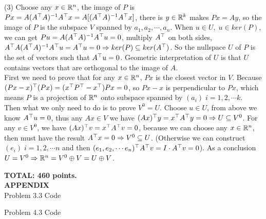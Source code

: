 \documentclass[12pt]{article}
\begin{document}
\medskip
(3) Choose any $x \in \mathbb{R}^n$, the image of $P$ is $Px = A(A^{\top}A)^{-1} A^{\top} x = A [(A^{\top}A)^{-1} A^{\top} x]$, there is $y \in \mathbb{R}^k$ makes $Px = Ay$, so the image of $P$ is the subspace $V$ spanned by $a_1, a_2, \cdots, a_n$.
When $u \in U ,\; u \in ker(P)$, we can get $Pu = A(A^{\top}A)^{-1} A^{\top} u = 0$, multiply $A^{\top}$ on both sides, $A^{\top} A (A^{\top}A)^{-1} A^{\top} u =  A^{\top} u = 0 \Rightarrow ker(P) \subseteq ker(A^{\top})$. So the nullspace $U$ of $P$ is the set of vectors such that $A^{\top} u = 0$. Geometric interpretation of $U$ is that $U$ contains vectors that are orthogonal to the image of $A$.\\
\medskip
First we need to prove that for any $x \in \mathbb{R}^n$, $Px$ is the closest vector in $V$. Because $(Px - x)^{\top} (Px) = (x^{\top} P^{\top} - x^{\top})Px = 0$, so $Px - x$ is perpendicular to $Px$, which means $P$ is a projection of $\mathbb{R}^n$ onto subspace spanned by $(a_i)\; i = 1,2,\cdots k$. \\
Then what we only need to do is to prove $V^0 = U$. Choose $u \in U$, from above we know $A^{\top} u = 0$, thus any $Ax \in V$ we have $(Ax)^{\top} y = x^{\top} A^{\top} y = 0 \Rightarrow U \subseteq V^0$. For any $v \in V^0$, we have $(A x )^{\top} v = x^{\top} A^{\top} v = 0$, because we can choose any $x \in \mathbb{R}^n$, then must have the result $A^{\top}x = 0 \Rightarrow V^0 \subseteq U$. (Otherwise we can construct $(e_i) \; i = 1,2,\cdots n$ and then $(e_1, e_2, \cdots e_n)^{\top} A^{\top} v  = I \cdot A^{\top} v = 0$). As a conclusion $U = V^0 \Rightarrow \mathbb{R}^n =  V^0 \oplus V = U \oplus V$.

\vspace{0.5cm}\noindent
{\bf TOTAL:  460 points.} \\

{\bf APPENDIX} \\

Problem 3.3 Code


Problem 4.3 Code

\end{document}
